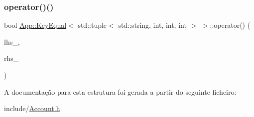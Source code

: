 \subsubsection{\texorpdfstring{operator()()}{operator()()}}
{\footnotesize\ttfamily bool \hyperlink{structApp_1_1KeyEqual}{App\+::\+Key\+Equal}$<$ std\+::tuple$<$ std\+::string, int, int, int $>$ $>$\+::operator() (\begin{DoxyParamCaption}\item[{const \hyperlink{structApp_1_1KeyEqual_3_01std_1_1tuple_3_01std_1_1string_00_01int_00_01int_00_01int_01_4_01_4_ad9c6d18451a835ce0b45f14d6a991e61}{Acct\+Key} \&}]{lhs\+\_\+,  }\item[{const \hyperlink{structApp_1_1KeyEqual_3_01std_1_1tuple_3_01std_1_1string_00_01int_00_01int_00_01int_01_4_01_4_ad9c6d18451a835ce0b45f14d6a991e61}{Acct\+Key} \&}]{rhs\+\_\+ }\end{DoxyParamCaption})\hspace{0.3cm}{\ttfamily [inline]}}



A documentação para esta estrutura foi gerada a partir do seguinte ficheiro\+:\begin{DoxyCompactItemize}
\item 
include/\hyperlink{Account_8h}{Account.\+h}\end{DoxyCompactItemize}
